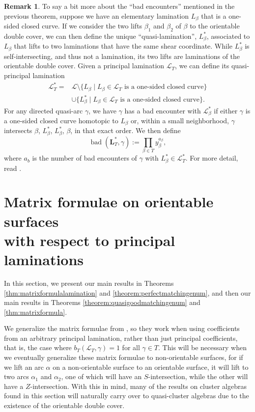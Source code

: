 \documentclass[pdftex]{sigma}
\numberwithin{equation}{section}
\theoremstyle{definition}
\newtheorem{Remark}[Theorem]{Remark}
\begin{document}
\begin{Remark}
 To say a bit more about the ``bad encounters'' mentioned in the previous theorem, suppose we have an elementary lamination $L_{\beta}$ that is a one-sided closed curve. If we consider the two lifts $\beta_1$ and $\beta_2$ of $\beta$ to the orientable double cover, we can then define the unique ``quasi-lamination'', $L^*_{\beta}$, associated to $L_{\beta}$ that lifts to two laminations that have the same shear coordinate. While $L^*_{\beta}$ is self-intersecting, and thus not a lamination, its two lifts are laminations of the orientable double cover.
 Given a principal lamination $\mathcal{L}_T$, we can define its quasi-principal lamination
 \begin{align*}
 \mathcal{L}_T^*={}&\mathcal{L}\setminus \{ L_{\beta} \mid L_{\beta}\in\mathcal{L}_{T} \text{ is a one-sided closed curve}\}\\
 &\cup \{ L^*_{\beta} \mid L_{\beta}\in\mathcal{L}_{T} \text{ is a one-sided closed curve}\}.
 \end{align*}
For any directed quasi-arc $\gamma$, we have $\gamma$ has a bad encounter with $\mathcal{L}^*_{\beta}$ if either $\gamma$ is a one-sided closed curve homotopic to $L_{\beta}$ or, within a small neighborhood, $\gamma$ intersects $\beta$, $L^*_{\beta}$, $L^*_{\beta}$, $\beta$, in that exact order. We then define
 \[\operatorname{bad}(\mathcal{\textbf{L}}_T^*, \gamma):=\prod_{\beta\in T} y_{\beta}^{a_{\beta}},\] where $a_b$ is the number of bad encounters of $\gamma$ with $L^*_{\beta}\in \mathcal{L}^*_T$. For more detail, read \cite[Section~5.3.2]{Wil19}.
\end{Remark}

\section[Matrix formulae on orientable surfaces with respect to principal laminations]{Matrix formulae on orientable surfaces\\ with respect to principal laminations}\label{section:matrixorientable}

In this section, we present our main results in Theorems \ref{thm:matrixformulalamination} and \ref{theorem:perfectmatchingenum}, and then our main results in Theorems \ref{theorem:quasigoodmatchingenum} and \ref{thm:matrixformula}.

We generalize the matrix formulae from \cite{MW13}, so they work when using coefficients from an arbitrary principal lamination, rather than just principal coefficients, that is, the case where ${b_T(\mathcal{L}_T, \gamma)=1}$ for all $\gamma\in T$. This will be necessary when we eventually generalize these matrix formulae to non-orientable surfaces, for if we lift an arc $\alpha$ on a non-orientable surface to an orientable surface, it will lift to two arcs $\alpha_1$ and $\alpha_2$, one of which will have an $S$-intersection, while the other will have a $Z$-intersection. With this in mind, many of the results on cluster algebras found in this section will naturally carry over to quasi-cluster algebras due to the existence of the orientable double cover.
\end{document}
